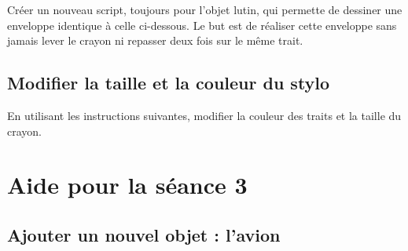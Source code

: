 Créer un nouveau script, toujours pour l'objet lutin, qui permette de dessiner une enveloppe identique à celle ci-dessous. Le but est de réaliser cette enveloppe sans jamais lever le crayon ni repasser deux fois sur le même trait.





\subsection{Modifier la taille et la couleur du stylo}

En utilisant les instructions suivantes, modifier la couleur des traits et la taille du crayon.











%
%
%
%









\section{Aide pour la séance 3}\label{correction_scratch3}



\subsection{Ajouter un nouvel objet : l'avion}

